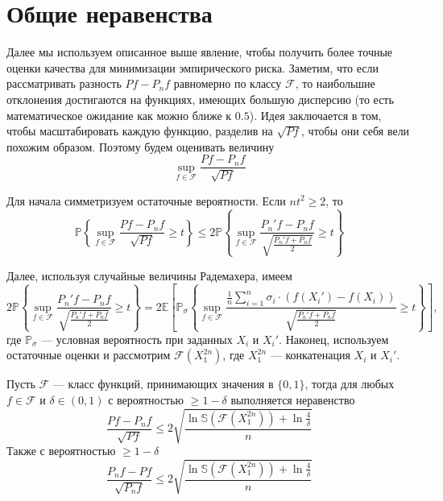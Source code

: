 \documentclass[12pt]{article}
\newtheorem{theorem}{\hskip\parindent Теорема}%
\begin{document}
\section{Общие неравенства}
Далее мы используем описанное выше явление, чтобы получить более точные оценки качества для минимизации эмпирического риска. Заметим, что если рассматривать разность $Pf-P_nf$ равномерно по классу $\mathcal{F}$, то наибольшие отклонения
достигаются на функциях, имеющих большую дисперсию (то есть математическое ожидание как можно ближе к $0.5$). Идея заключается в том, чтобы масштабировать каждую функцию, разделив на $\sqrt{Pf}$, чтобы они себя вели похожим образом. Поэтому будем оценивать величину
\begin{equation*}
	\sup\limits_{f\in\mathcal{F}}\frac{Pf-P_nf}{\sqrt{Pf}}
\end{equation*}

Для начала симметризуем остаточные вероятности. Если $nt^2\geqslant2$, то
\begin{equation*}
	\mathbb{P}\left\{\sup\limits_{f\in\mathcal{F}}\frac{Pf-P_nf}{\sqrt{Pf}}\geqslant t\right\}\leqslant2\mathbb{P}\left\{\sup\limits_{f\in\mathcal{F}}\frac{P_n'f-P_nf}{\sqrt{\frac{P_n'f+P_nf}{2}}}\geqslant t\right\}
\end{equation*}

Далее, используя случайные величины Радемахера, имеем
\begin{equation*}
	2\mathbb{P}\left\{\sup\limits_{f\in\mathcal{F}}\frac{P_n'f-P_nf}{\sqrt{\frac{P_n'f+P_nf}{2}}}\geqslant t\right\}=2\mathbb{E}\left[\mathbb{P}_\sigma\left\{\sup\limits_{f\in\mathcal{F}}\frac{\frac{1}{n}\sum\limits_{i=1}^{n}\sigma_i\cdot(f(X_i')-f(X_i))}{\sqrt{\frac{P_n'f+P_nf}{2}}}\geqslant t\right\}\right],
\end{equation*}
где $\mathbb{P}_\sigma$ --- условная вероятность при заданных $X_i$ и $X_i'$. Наконец, используем остаточные оценки и рассмотрим $\mathcal{F}(X_1^{2n})$, где $X_1^{2n}$ --- конкатенация $X_i$ и $X_i'$.
\begin{theorem}\label{thScaledEstimate}
	Пусть $\mathcal{F}$ --- класс функций, принимающих значения в $\{0,1\}$, тогда для любых $f\in\mathcal{F}$ и $\delta\in(0,1)$ с вероятностью $\geqslant1-\delta$ выполняется неравенство
	\begin{equation*}
		\frac{Pf-P_nf}{\sqrt{Pf}}\leqslant2\sqrt{\frac{\ln\mathbb{S}(\mathcal{F}(X_1^{2n}))+\ln\frac{4}{\delta}}{n}}
	\end{equation*}
Также с вероятностью $\geqslant1-\delta$
\begin{equation*}
	\frac{P_nf-Pf}{\sqrt{P_nf}}\leqslant2\sqrt{\frac{\ln\mathbb{S}(\mathcal{F}(X_1^{2n}))+\ln\frac{4}{\delta}}{n}}
\end{equation*}
\end{theorem}
\end{document}
